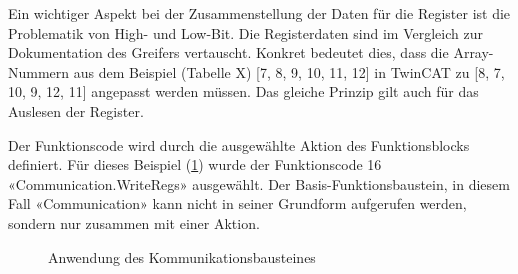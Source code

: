 		\begin{bfhNoteBox}
			Ein wichtiger Aspekt bei der Zusammenstellung der Daten für die Register ist die Problematik von High- und Low-Bit. Die Registerdaten sind im Vergleich zur Dokumentation des Greifers vertauscht. Konkret bedeutet dies, dass die Array-Nummern aus dem Beispiel (Tabelle X) [7, 8, 9, 10, 11, 12] in TwinCAT zu [8, 7, 10, 9, 12, 11] angepasst werden müssen. Das gleiche Prinzip gilt auch für das Auslesen der Register.
		\end{bfhNoteBox}
		\vspace{3mm} 
		Der Funktionscode wird durch die ausgewählte Aktion des Funktionsblocks definiert. Für dieses Beispiel (\ref{fig:FB_Anwenung_Kommunikation}) wurde der Funktionscode 16 «Communication.WriteRegs» ausgewählt. Der Basis-Funktionsbaustein, in diesem Fall «Communication» kann nicht in seiner Grundform aufgerufen werden, sondern nur zusammen mit einer Aktion. 
		
		\begin{figure}[H]
			\centering
			\captionsetup{justification=centering}
			\caption{Anwendung des Kommunikationsbausteines}
			\label{fig:FB_Anwenung_Kommunikation}
		\end{figure}
		
		
		
		